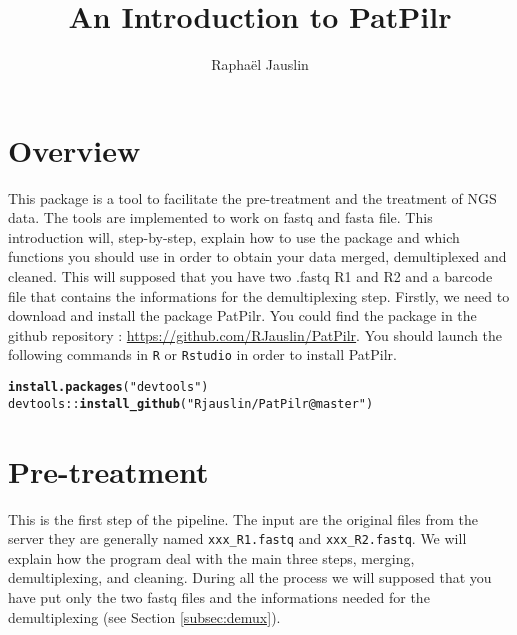 \documentclass{article}\usepackage[]{graphicx}\usepackage[]{color}
\makeatletter
\newcommand{\hlstr}[1]{\textcolor[rgb]{0.192,0.494,0.8}{#1}}%
\newcommand{\hlopt}[1]{\textcolor[rgb]{0,0,0}{#1}}%
\newcommand{\hlstd}[1]{\textcolor[rgb]{0.345,0.345,0.345}{#1}}%
\newcommand{\hlkwd}[1]{\textcolor[rgb]{0.737,0.353,0.396}{\textbf{#1}}}%
\newenvironment{kframe}{%
 \def\at@end@of@kframe{}%
 \ifinner\ifhmode%
  \def\at@end@of@kframe{\end{minipage}}%
  \begin{minipage}{\columnwidth}%
 \fi\fi%
 \def\FrameCommand##1{\hskip\@totalleftmargin \hskip-\fboxsep
 \colorbox{shadecolor}{##1}\hskip-\fboxsep
     \hskip-\linewidth \hskip-\@totalleftmargin \hskip\columnwidth}%
 \MakeFramed {\advance\hsize-\width
   \@totalleftmargin\z@ \linewidth\hsize
   \@setminipage}}%
 {\par\unskip\endMakeFramed%
 \at@end@of@kframe}
\newenvironment{knitrout}{}{} %
\makeatother
\begin{document}
\title{An Introduction to PatPilr}

\author{Rapha\"el Jauslin}

\maketitle

\newpage

\tableofcontents
\newpage

\section{Overview}

This package is a tool to facilitate the pre-treatment and the treatment of NGS data. The tools are implemented to work on fastq and fasta file. This introduction will, step-by-step, explain how to use the package and which functions you should use in order to obtain your data merged, demultiplexed and cleaned. This will supposed that you have two .fastq R1 and R2 and a barcode file that contains the informations for the demultiplexing step. Firstly, we need to download and install the package PatPilr. You could find the package in the github repository : \url{https://github.com/RJauslin/PatPilr}. You should launch the following commands in \texttt{R} or \texttt{Rstudio} in order to install PatPilr.

\begin{knitrout}
\color{fgcolor}\begin{kframe}
\begin{alltt}
\hlkwd{install.packages}\hlstd{(}\hlstr{"devtools"}\hlstd{)}
\hlstd{devtools}\hlopt{::}\hlkwd{install_github}\hlstd{(}\hlstr{"Rjauslin/PatPilr@master"}\hlstd{)}
\end{alltt}
\end{kframe}
\end{knitrout}

\section{Pre-treatment}
\label{sec:pretreatment}
This is the first step of the pipeline. The input are the original files from the server they are generally named \texttt{xxx\_R1.fastq} and \texttt{xxx\_R2.fastq}. We will explain how the program deal with the main three steps, merging, demultiplexing, and cleaning. During all the process we will supposed that you have put only the two fastq files and the informations needed for the demultiplexing (see Section \ref{subsec:demux}).
\end{document}
